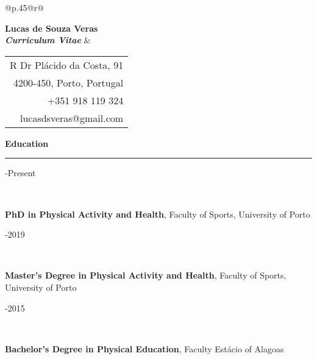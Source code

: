 \documentclass[10t]{article}
\begin{document}
\noindent
\begin{tabular*}{\textwidth}{@{}p{.45\textwidth}@{\extracolsep{\fill}}r@{}}
\raggedright
{\LARGE \textbf{Lucas de Souza Veras}} \\
\doublespacing
\Large \textit{\textbf{Curriculum Vitae}}
&
\begin{tabular}[t]{ r@{}}
\footnotesize R Dr Plácido da Costa, 91 \\
\footnotesize 4200-450, Porto, Portugal \\
\footnotesize +351 918 119 324 \\
\footnotesize lucasdsveras@gmail.com
\end{tabular}
\end{tabular*}

\vspace{2em}

\noindent
{\large \textbf{Education}} \\
\noindent \rule{\linewidth}{0.8pt}

\vspace{1em}

\noindent
\begin{minipage}[t]{0.15\linewidth}
	-Present
\end{minipage}
\
\begin{minipage}[t]{0.85\linewidth}
\begin{minipage}[t]{\columnwidth}
	\textbf{PhD in Physical Activity and Health}, Faculty of Sports, University of Porto
\end{minipage}
\end{minipage}

\vspace{0.5em}

\noindent
\begin{minipage}[t]{0.15\linewidth}
	-2019
\end{minipage}
\
\begin{minipage}[t]{0.85\linewidth}
\begin{minipage}[t]{\columnwidth}
	\textbf{Master's Degree in Physical Activity and Health}, Faculty of Sports, University of Porto
\end{minipage}
\end{minipage}

\vspace{0.5em}

\noindent
\begin{minipage}[t]{0.15\linewidth}
		-2015
\end{minipage}
\
\begin{minipage}[t]{0.85\linewidth}
\begin{minipage}[t]{\columnwidth}
	\textbf{Bachelor's Degree in Physical Education}, Faculty Estácio of Alagoas
\end{minipage}
\end{minipage}
\end{document}
